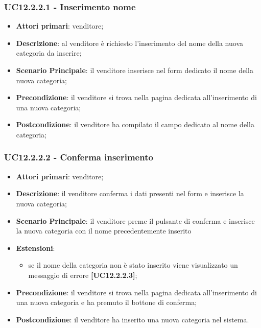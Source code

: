 \subsubsection{UC12.2.2.1 - Inserimento nome}
\begin{itemize}
\item \textbf{Attori primari}: venditore;
\item \textbf{Descrizione}: al venditore è richiesto l'inserimento del nome della nuova categoria da inserire;
\item \textbf{Scenario Principale}: il venditore inserisce nel form dedicato il nome della nuova categoria;
\item \textbf{Precondizione}: il venditore si trova nella pagina dedicata all'inserimento di una nuova categoria;
\item \textbf{Postcondizione}: il venditore ha compilato il campo dedicato al nome della categoria;
\end{itemize}

\subsubsection{UC12.2.2.2 - Conferma inserimento}
\begin{itemize}
\item \textbf{Attori primari}: venditore;
\item \textbf{Descrizione}: il venditore conferma i dati presenti nel form e inserisce la nuova categoria;
\item \textbf{Scenario Principale}: il venditore preme il pulsante di conferma e inserisce la nuova categoria con il nome precedentemente inserito
\item \textbf{Estensioni}: 
\begin{itemize}
	\item se il nome della categoria non è stato inserito viene visualizzato un messaggio di errore \textbf{[UC12.2.2.3]};
\end{itemize} 
\item \textbf{Precondizione}: il venditore si trova nella pagina dedicata all'inserimento di una nuova categoria e ha premuto il bottone di conferma;
\item \textbf{Postcondizione}: il venditore ha inserito una nuova categoria nel sistema.
\end{itemize}

